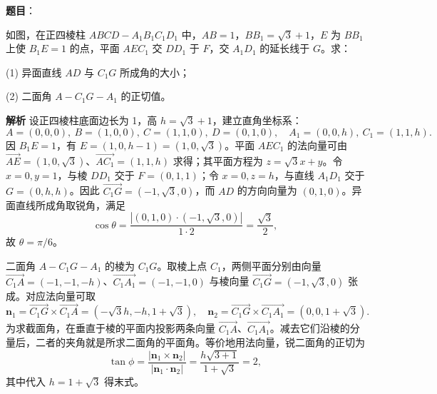 \begin{answer}

\textbf{题目}：

如图，在正四棱柱 \(ABCD-A_1B_1C_1D_1\) 中，\(AB=1\)，\(BB_1=\sqrt3+1\)，\(E\) 为 \(BB_1\) 上使 \(B_1E=1\) 的点，平面 \(AEC_1\) 交 \(DD_1\) 于 \(F\)，交 \(A_1D_1\) 的延长线于 \(G\)。求：

(1) 异面直线 \(AD\) 与 \(C_1G\) 所成角的大小；

(2) 二面角 \(A-C_1G-A_1\) 的正切值。
\nopagebreak[4]
\begin{center}\end{center}
\nopagebreak[4]
\textbf{解析}
设正四棱柱底面边长为 1，高 \(h=\sqrt3+1\)，建立直角坐标系：
\nopagebreak[4]
\[
A=(0,0,0),\ B=(1,0,0),\ C=(1,1,0),\ D=(0,1,0),\quad A_1=(0,0,h),\ C_1=(1,1,h).
\]
因 \(B_1E=1\)，有 \(E=(1,0,h-1)=(1,0,\sqrt3)\)。平面 \(AEC_1\) 的法向量可由 \(\overrightarrow{AE}=(1,0,\sqrt3)\)、\(\overrightarrow{AC_1}=(1,1,h)\) 求得；其平面方程为 \(z=\sqrt3x+y\)。令 \(x=0,y=1\)，与棱 \(DD_1\) 交于 \(F=(0,1,1)\)；令 \(x=0,z=h\)，与直线 \(A_1D_1\) 交于 \(G=(0,h,h)\)。因此 \(\overrightarrow{C_1G}=(-1,\sqrt3,0)\)，而 \(AD\) 的方向向量为 \((0,1,0)\)。异面直线所成角取锐角，满足
\nopagebreak[4]
\[
\cos\theta=\frac{|(0,1,0)\cdot(-1,\sqrt3,0)|}{1\cdot2}=\frac{\sqrt3}{2},
\]
故 \(\theta=\pi/6\)。

二面角 \(A-C_1G-A_1\) 的棱为 \(C_1G\)。取棱上点 \(C_1\)，两侧平面分别由向量 \(\overrightarrow{C_1A}=(-1,-1,-h)\)、\(\overrightarrow{C_1A_1}=(-1,-1,0)\) 与棱向量 \(\overrightarrow{C_1G}=(-1,\sqrt3,0)\) 张成。对应法向量可取
\nopagebreak[4]
\[
\mathbf n_1=\overrightarrow{C_1G}\times\overrightarrow{C_1A}=( -\sqrt3h,-h,1+\sqrt3),\quad
\mathbf n_2=\overrightarrow{C_1G}\times\overrightarrow{C_1A_1}=(0,0,1+\sqrt3).
\]
为求截面角，在垂直于棱的平面内投影两条向量 \(\overrightarrow{C_1A}\)、\(\overrightarrow{C_1A_1}\)。减去它们沿棱的分量后，二者的夹角就是所求二面角的平面角。等价地用法向量，锐二面角的正切为
\nopagebreak[4]
\[
\tan\phi=\frac{|\mathbf n_1\times\mathbf n_2|}{|\mathbf n_1\cdot\mathbf n_2|}
=\frac{h\sqrt{3+1}}{1+\sqrt3}=2,
\]
其中代入 \(h=1+\sqrt3\) 得末式。



\end{answer}
